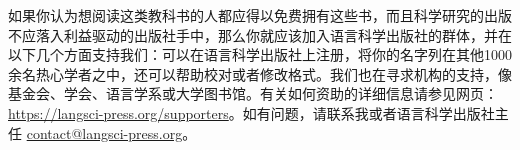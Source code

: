 如果你认为想阅读这类教科书的人都应得以免费拥有这些书，而且科学研究的出版不应落入利益驱动的出版社手中，那么你就应该加入语言科学出版社的群体，并在以下几个方面支持我们：可以在语言科学出版社上注册，将你的名字列在其他1000余名热心学者之中，还可以帮助校对或者修改格式。我们也在寻求机构的支持，像基金会、学会、语言学系或大学图书馆。有关如何资助的详细信息请参见网页：\url{https://langsci-press.org/supporters}。如有问题，请联系我或者语言科学出版社主任 \href{mailto:contact@langsci-press.org}{contact@langsci-press.org}。
